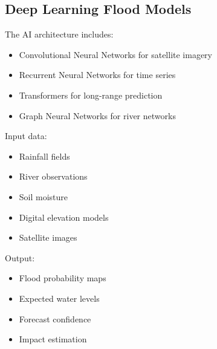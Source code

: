 
\subsection{Deep Learning Flood Models}

The AI architecture includes:

\begin{itemize}

\item Convolutional Neural Networks for satellite imagery

\item Recurrent Neural Networks for time series

\item Transformers for long-range prediction

\item Graph Neural Networks for river networks

\end{itemize}


Input data:

\begin{itemize}

\item Rainfall fields

\item River observations

\item Soil moisture

\item Digital elevation models

\item Satellite images

\end{itemize}


Output:

\begin{itemize}

\item Flood probability maps

\item Expected water levels

\item Forecast confidence

\item Impact estimation

\end{itemize}



